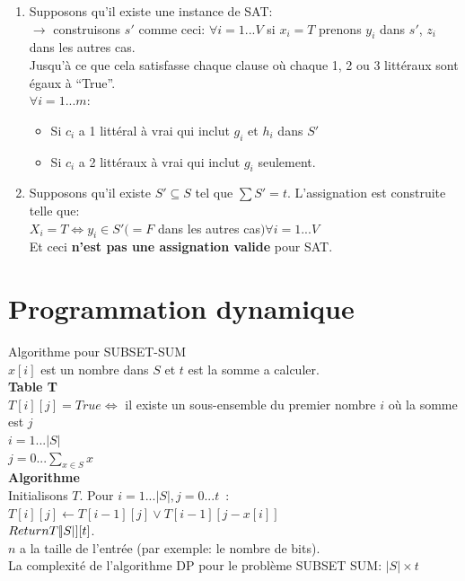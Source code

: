 \documentclass[a4paper,12pt]{article}
\begin{document}
    \begin{enumerate}
      \item Supposons qu'il existe une instance de SAT:\\
	  $\rightarrow$ construisons $s'$ comme ceci: $\forall i = 1 ... V$ si $x_i = T$ prenons $y_i$ dans $s'$, $z_i$ dans les autres cas.\\
	  Jusqu'à ce que cela satisfasse chaque clause où chaque 1, 2 ou 3 littéraux sont égaux à ``True''.\\
	  $\forall i = 1...m$:
	  \begin{itemize}
	    \item Si $c_i$ a 1 littéral à vrai qui inclut $g_i$ et $h_i$ dans $S'$
	    \item Si $c_i$ a 2 littéraux à vrai qui inclut $g_i$ seulement.
	  \end{itemize}
      \item Supposons qu'il existe $S' \subseteq S$ tel que $\sum S' = t$. L’assignation est construite telle que:\\
	  $X_i = T \Leftrightarrow y_i \in S' (= F$ dans les autres cas$) \forall i = 1 ... V$\\
	  Et ceci \textbf{n'est pas une assignation valide} pour SAT.
    \end{enumerate}


\section{Programmation dynamique}
  Algorithme pour SUBSET-SUM\\
  $x[i]$ est un nombre dans $S$ et $t$ est la somme a calculer.\\

  \textbf{Table T}\\
    $T[i][j] = True \Leftrightarrow$ il existe un sous-ensemble du premier nombre $i$ où la somme est $j$\\
    $i = 1 ... |S|$\\
    $j = 0 ... \sum_{x \in S}x$\\

  \textbf{Algorithme}\\
    Initialisons $T$. Pour $i = 1 ... |S|, j = 0 ... t$~:\\
    $T[i][j] \leftarrow T[i-1][j] \vee T[i-1][j-x[i]]$\\
    $Return T[\abs S][t]$.\\
    $n$ a la taille de l'entrée (par exemple: le nombre de bits).\\
    La complexité de l'algorithme DP pour le problème SUBSET SUM: $|S| \times t$\\
\end{document}
